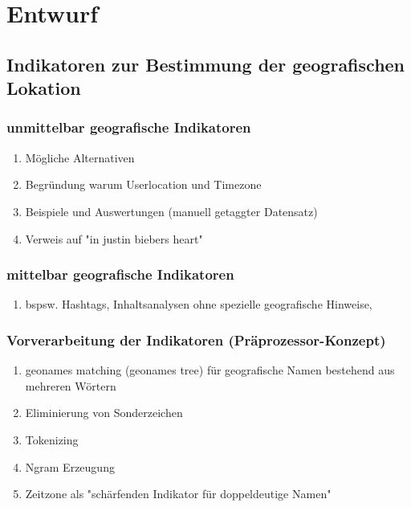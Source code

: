 \chapter{Entwurf} 

\section{Indikatoren zur Bestimmung der geografischen Lokation}

	\subsection{unmittelbar geografische Indikatoren}
		\begin{enumerate}
			\item Mögliche Alternativen
			\item Begründung warum Userlocation und Timezone
			\item Beispiele und Auswertungen (manuell getaggter Datensatz)
			\item Verweis auf "in justin biebers heart"
		\end{enumerate}

	\subsection{mittelbar geografische Indikatoren}
		\begin{enumerate}
			\item bspsw. Hashtags, Inhaltsanalysen ohne spezielle geografische Hinweise, 
		\end{enumerate}

	\subsection{Vorverarbeitung der Indikatoren (Präprozessor-Konzept)}
		\begin{enumerate}
			\item geonames matching (geonames tree) für geografische Namen bestehend aus mehreren Wörtern
			\item Eliminierung von Sonderzeichen
			\item Tokenizing
			\item Ngram Erzeugung
			\item {} Zeitzone als "schärfenden Indikator für doppeldeutige Namen"
		\end{enumerate}

